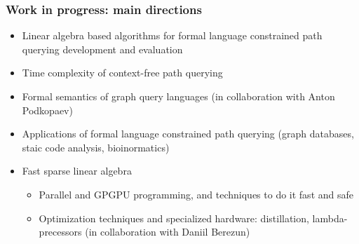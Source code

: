 \documentclass[xcolor=table, aspectratio=169]{beamer}
\begin{document}
\begin{frame}[fragile]

  \frametitle{Work in progress: main directions}
\begin{itemize}
      \item Linear algebra based algorithms for formal language constrained path querying development and evaluation
      \item Time complexity of context-free path querying
      \item Formal semantics of graph query languages (in collaboration with Anton Podkopaev) 
      \item Applications of formal language constrained path querying (graph databases, staic code analysis, bioinormatics)
      \item Fast sparse linear algebra
      \begin{itemize}
        \item Parallel and GPGPU programming, and techniques to do it fast and safe
        \item Optimization techniques and specialized hardware: distillation, lambda-precessors (in collaboration with Daniil Berezun)
      \end{itemize}
\end{itemize}
\end{frame}
\end{document}
